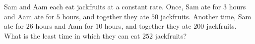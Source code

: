 Sam and Aam each eat jackfruits at a constant rate. Once, Sam ate for $3$ hours and Aam ate for $5$ hours, and together they ate $50$ jackfruits. Another time, Sam ate for $26$ hours and Aam for $10$ hours, and together they ate $200$ jackfruits. What is the least time in which they can eat $252$ jackfruits?
